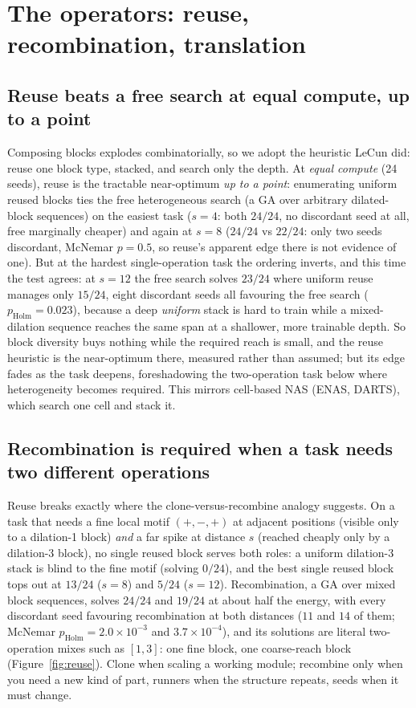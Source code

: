 \documentclass[11pt]{article}
\begin{document}
\section{The operators: reuse, recombination, translation}

\subsection{Reuse beats a free search at equal compute, up to a point}\label{subsec:reuse}

Composing blocks explodes combinatorially, so we adopt the heuristic LeCun did: reuse one block type,
stacked, and search only the depth. At \emph{equal compute} (24 seeds), reuse is the tractable near-optimum
\emph{up to a point}: enumerating uniform reused blocks ties the free heterogeneous search (a GA over
arbitrary dilated-block sequences) on the easiest task ($s{=}4$: both $24/24$, no discordant seed at all,
free marginally cheaper) and again at $s{=}8$ ($24/24$ vs $22/24$: only two seeds discordant, McNemar
$p{=}0.5$, so reuse's apparent edge there is not evidence of one). But at the hardest single-operation task the ordering
inverts, and this time the test agrees: at $s{=}12$ the free search solves $23/24$ where uniform reuse
manages only $15/24$, eight discordant seeds all favouring the free search
($p_{\mathrm{Holm}}{=}0.023$), because a deep
\emph{uniform} stack is hard to train while a mixed-dilation sequence reaches the same span at a shallower,
more trainable depth. So block diversity buys nothing while the required reach is small, and the reuse
heuristic is the near-optimum there, measured rather than assumed; but its edge fades as the task deepens,
foreshadowing the two-operation task below
where heterogeneity becomes required. This mirrors cell-based NAS (ENAS, DARTS),
which search one cell and stack it.

\subsection{Recombination is required when a task needs two different operations}

Reuse breaks exactly where the clone-versus-recombine analogy suggests. On a task that needs a fine local motif
$(+,-,+)$ at adjacent positions (visible only to a dilation-1 block) \emph{and} a far spike at distance
$s$ (reached cheaply only by a dilation-3 block), no single reused block serves both roles: a uniform
dilation-3 stack is blind to the fine motif (solving $0/24$), and the best single reused block tops out at
$13/24$ ($s{=}8$) and $5/24$ ($s{=}12$). Recombination, a GA over mixed block sequences, solves $24/24$ and
$19/24$ at about half the energy, with every discordant seed favouring recombination at both distances
($11$ and $14$ of them; McNemar $p_{\mathrm{Holm}}{=}2.0{\times}10^{-3}$ and $3.7{\times}10^{-4}$),
and its solutions are literal two-operation mixes such as $[1,3]$: one
fine block, one coarse-reach block (Figure~\ref{fig:reuse}). Clone when scaling a working module; recombine only when you need a new kind of
part, runners when the structure repeats, seeds when it must change.
\end{document}
